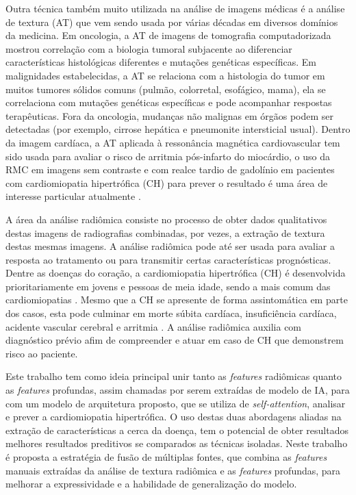 Outra técnica também muito utilizada na análise de imagens médicas é a análise de textura (AT) que vem sendo usada por várias décadas em diversos domínios da medicina. Em oncologia, a AT de imagens de tomografia computadorizada mostrou correlação com a biologia tumoral subjacente ao diferenciar características histológicas diferentes e mutações genéticas específicas. Em malignidades estabelecidas, a AT se relaciona com a histologia do tumor em muitos tumores sólidos comuns (pulmão, colorretal, esofágico, mama), ela se correlaciona com mutações genéticas específicas e pode acompanhar respostas terapêuticas. Fora da oncologia, mudanças não malignas em órgãos podem ser detectadas (por exemplo, cirrose hepática e pneumonite intersticial usual). Dentro da imagem cardíaca, a AT aplicada à ressonância magnética cardiovascular tem sido usada para avaliar o risco de arritmia pós-infarto do miocárdio, o uso da RMC em imagens sem contraste e com realce tardio de gadolínio em pacientes com cardiomiopatia hipertrófica (CH) para prever o resultado é uma área de interesse particular atualmente \cite{schofieldTextureAnalysisCardiovascular2019a}.

A área da análise radiômica consiste no processo de obter dados qualitativos destas imagens de radiografias combinadas, por vezes, a extração de textura destas mesmas imagens. A análise radiômica pode até ser usada para avaliar a resposta ao tratamento ou para transmitir certas características prognósticas. Dentre as doenças do coração, a cardiomiopatia hipertrófica (CH) é desenvolvida prioritariamente em jovens e pessoas de meia idade, sendo a mais comum das cardiomiopatias . Mesmo que a CH se apresente de forma assintomática em parte dos casos, esta pode culminar em morte súbita cardíaca, insuficiência cardíaca, acidente vascular cerebral e arritmia \cite{kwonComparisonMortalityCause2022}. A análise radiômica auxilia com diagnóstico prévio afim de compreender e atuar em caso de CH que demonstrem risco ao paciente.


Este trabalho tem como ideia principal unir tanto as \textit{features} radiômicas quanto as \textit{features} profundas, assim chamadas por serem extraídas de modelo de IA, para com um modelo de arquitetura proposto, que se utiliza de \textit{self-attention}, analisar e prever a cardiomiopatia hipertrófica. O uso destas duas abordagens aliadas na extração de características a cerca da doença, tem o potencial de obter resultados melhores resultados preditivos se comparados as técnicas isoladas. Neste trabalho é proposta a estratégia de fusão de múltiplas fontes, que combina as \textit{features} manuais extraídas da análise de textura radiômica e as \textit{features} profundas, para melhorar a expressividade e a habilidade de generalização do modelo.

